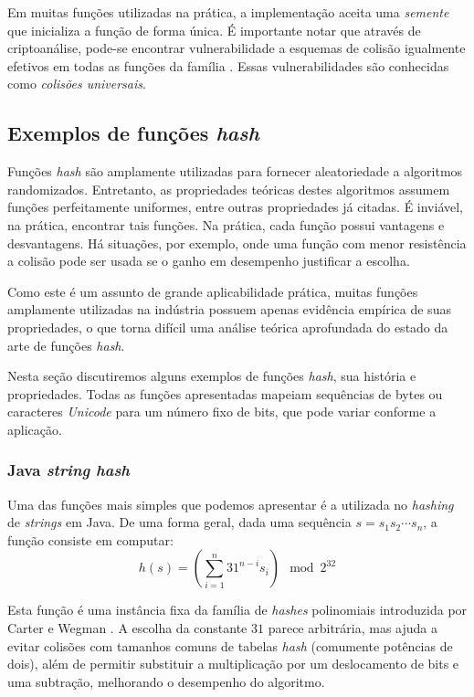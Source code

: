 Em muitas funções utilizadas na prática, a implementação aceita uma \emph{semente} que inicializa a função de forma única. É importante notar que através de criptoanálise, pode-se encontrar vulnerabilidade a esquemas de colisão igualmente efetivos em todas as funções da família \cite{bernsteinhash}. Essas vulnerabilidades são conhecidas como \emph{colisões universais}.

\subsection{Exemplos de funções \emph{hash}}

Funções \emph{hash} são amplamente utilizadas para fornecer aleatoriedade a algoritmos randomizados. Entretanto, as propriedades teóricas destes algoritmos assumem funções perfeitamente uniformes, entre outras propriedades já citadas. É inviável, na prática, encontrar tais funções. Na prática, cada função possui vantagens e desvantagens. Há situações, por exemplo, onde uma função com menor resistência a colisão pode ser usada se o ganho em desempenho justificar a escolha.

Como este é um assunto de grande aplicabilidade prática, muitas funções amplamente utilizadas na indústria possuem apenas evidência empírica de suas propriedades, o que torna difícil uma análise teórica aprofundada do estado da arte de funções \emph{hash}.

Nesta seção discutiremos alguns exemplos de funções \emph{hash}, sua história e propriedades. Todas as funções apresentadas mapeiam sequências de bytes ou caracteres \emph{Unicode} para um número fixo de bits, que pode variar conforme a aplicação.

\subsubsection{Java \emph{string hash}}

Uma das funções mais simples que podemos apresentar é a utilizada no \emph{hashing} de \emph{strings} em Java. De uma forma geral, dada uma sequência $s = s_1s_2\cdots s_n$, a função consiste em computar:
\[
    h(s) = \left( \sum_{i=1}^n  31^{n-i} s_i \right)\mod 2^{32}
\]

Esta função é uma instância fixa da família de \emph{hashes} polinomiais introduzida por Carter e Wegman \cite{carter1977universal}. A escolha da constante $31$ parece arbitrária, mas ajuda a evitar colisões com tamanhos comuns de tabelas \emph{hash} (comumente potências de dois), além de permitir substituir a multiplicação por um deslocamento de bits e uma subtração, melhorando o desempenho do algoritmo. 

